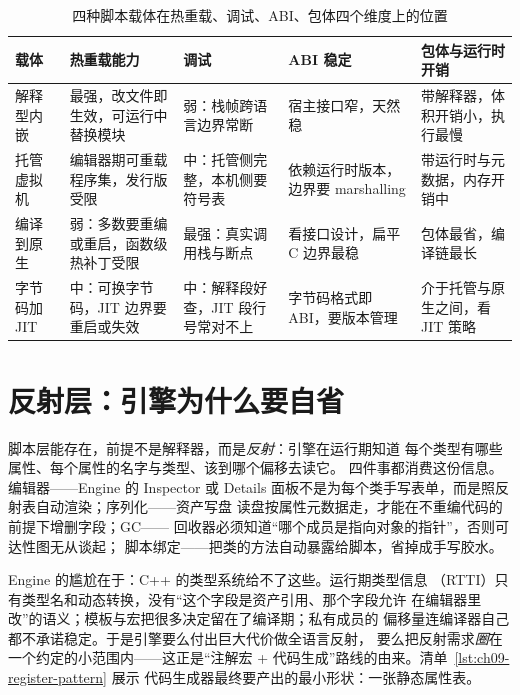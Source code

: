 \documentclass[12pt,a4paper,fontset=fandol]{ctexbook}
\newcommand{\Lang}[1]{\textsf{#1}}
\newcommand{\CL}{\Lang{C}}
\newcommand{\CPP}{\Lang{C++}}
\newcommand{\DomEngine}{\Lang{Engine}}
\begin{document}
\begin{table}[ht]
\centering
\caption{四种脚本载体在热重载、调试、ABI、包体四个维度上的位置}
\label{tab:ch09-carrier-matrix}
\begin{tabular}{>{\raggedright\arraybackslash}p{}
                >{\raggedright\arraybackslash}p{}
                >{\raggedright\arraybackslash}p{}
                >{\raggedright\arraybackslash}p{}
                >{\raggedright\arraybackslash}p{}}
\toprule
\textbf{载体} & \textbf{热重载能力} & \textbf{调试} & \textbf{ABI 稳定} & \textbf{包体与运行时开销} \\
\midrule
解释型内嵌 & 最强，改文件即生效，可运行中替换模块 & 弱：栈帧跨语言边界常断 & 宿主接口窄，天然稳 & 带解释器，体积开销小，执行最慢 \\
托管虚拟机 & 编辑器期可重载程序集，发行版受限 & 中：托管侧完整，本机侧要符号表 & 依赖运行时版本，边界要 marshalling & 带运行时与元数据，内存开销中 \\
编译到原生 & 弱：多数要重编或重启，函数级热补丁受限 & 最强：真实调用栈与断点 & 看接口设计，扁平 \CL{} 边界最稳 & 包体最省，编译链最长 \\
字节码加 JIT & 中：可换字节码，JIT 边界要重启或失效 & 中：解释段好查，JIT 段行号常对不上 & 字节码格式即 ABI，要版本管理 & 介于托管与原生之间，看 JIT 策略 \\
\bottomrule
\end{tabular}
\end{table}

\section{反射层：引擎为什么要自省}
\label{sec:ch09-reflection}

脚本层能存在，前提不是解释器，而是\emph{反射}：引擎在运行期知道
每个类型有哪些属性、每个属性的名字与类型、该到哪个偏移去读它。
四件事都消费这份信息。编辑器——\DomEngine{} 的 Inspector 或 Details
面板不是为每个类手写表单，而是照反射表自动渲染；序列化——资产写盘
读盘按属性元数据走，才能在不重编代码的前提下增删字段；GC——
回收器必须知道``哪个成员是指向对象的指针''，否则可达性图无从谈起；
脚本绑定——把类的方法自动暴露给脚本，省掉成手写胶水。

\DomEngine{} 的尴尬在于：\CPP{} 的类型系统给不了这些。运行期类型信息
（RTTI）只有类型名和动态转换，没有``这个字段是资产引用、那个字段允许
在编辑器里改''的语义；模板与宏把很多决定留在了编译期；私有成员的
偏移量连编译器自己都不承诺稳定。于是引擎要么付出巨大代价做全语言反射，
要么把反射需求\emph{圈}在一个约定的小范围内——这正是``注解宏 +
代码生成''路线的由来。清单~\ref{lst:ch09-register-pattern} 展示
代码生成器最终要产出的最小形状：一张静态属性表。
\end{document}

